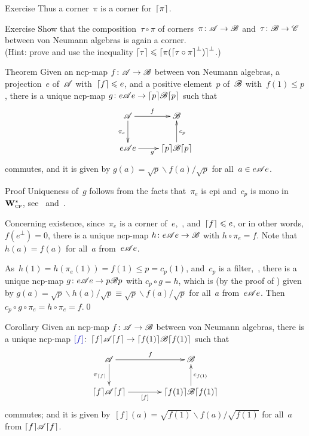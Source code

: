 \documentclass[a]{subfiles}
\begin{document}
\begin{parsec}
\begin{point}{Exercise}
Thus a corner~$\pi$ is a corner for~$\left\lceil\pi\right\rceil$.
\end{point}
\begin{point}{Exercise}%
Show that the composition~$\tau\circ \pi$
of corners~$\pi\colon \mathscr{A}\to\mathscr{B}$
and~$\tau\colon \mathscr{B}\to\mathscr{C}$
between von Neumann algebras
is again a corner.\\
(Hint:
prove
and use the inequality
$\left\lceil\tau\right\rceil\leqslant \left\lceil\smash{\pi(\left\lceil\tau\circ \pi\right\rceil^\perp)}\right\rceil^\perp$.)
\end{point}
\begin{point}{Theorem}%
Given an ncp-map $f\colon\mathscr{A}\to\mathscr{B}$
between von Neumann algebras,
a projection~$e$ of~$\mathscr{A}$
with~$\left\lceil f\right\rceil\leqslant e$,
and a positive element~$p$
of~$\mathscr{B}$ with~$f(1) \leq p$,
there is a unique ncp-map
$g \colon e\mathscr{A} e
\to \left\lceil p\right\rceil\!\mathscr{B}\!\left\lceil p\right\rceil$
such that
\begin{equation*}
\xymatrix{
\scrA
\ar[r]^-f
\ar[d]_{\pi_e}
&
\scrB
\\
e\scrA e
\ar[r]_g
& 
\ceil{p}\!\scrB\!\ceil{p}
\ar[u]_{c_p}
}
\end{equation*}
commutes,
and it is given by
$g(a)=\sqrt{p}\backslash f(a)/\!\sqrt{p}$
for all~$a\in e\mathscr{A} e$.
\begin{point}{Proof}%
Uniqueness of~$g$ follows from the facts
that~$\pi_e$ is epi and~$c_p$ is mono
in~$\mathbf{W}^*_{\text{\textsc{cp}}}$,
see~ and~.

Concerning existence, 
since~$\pi_e$ is a corner of~$e$,~,
and~$\left\lceil f\right\rceil\leqslant e$,
or in other words, $f(e^\perp)=0$,
there is a unique ncp-map $h\colon e\mathscr{A} e\to \mathscr{B}$
with $h \circ \pi_e = f$.
Note that~$h(a)=f(a)$ for all~$a$ from~$e\mathscr{A} e$.

As~$h(1)=h(\pi_e(1))=f(1)\leq p=c_p(1)$,
and~$c_p$ is a filter,~,
there is a unique ncp-map
$g\colon e\mathscr{A} e \to p \mathscr{B} p$
with $c_p\circ g = h$,
which is (by the proof of ) given by
$g(a)=\sqrt{p}\backslash h(a)/\sqrt{p}
\equiv \sqrt{p}\backslash f(a)/\sqrt{p}$
for all~$a$ from~$e\mathscr{A} e$.
Then~$c_p\circ g\circ \pi_e = h\circ \pi_e = f$.\qed
\end{point}
\end{point}
\begin{point}[square-f]{Corollary}%
Given an ncp-map $f\colon \mathscr{A}\to\mathscr{B}$
between von Neumann algebras,
there is a unique ncp-map $\Define{[f]}\colon 
\ceil{f}\!\scrA\!\ceil{f}
\to
\ceil{f(1)}\!\scrB\!\ceil{f(1)}$%
such that 
\begin{equation*}
\xymatrix@C=4em{
\scrA
\ar[r]^-f
\ar[d]_{\pi_{\ceil{f}}}
&
\scrB
\\
\ceil{f}\!\scrA\!\ceil{f}
\ar[r]_-{[f]}
& 
\ceil{f(1)}\!\scrB\!\ceil{f(1)}
\ar[u]_{c_{f(1)}}
}
\end{equation*}
commutes;
and it is given by~$[f](a)=\sqrt{f(1)}\backslash f(a)/\!\sqrt{f(1)}$
for all~$a$ from $\left\lceil f\right\rceil\!\mathscr{A}\!\left\lceil f\right\rceil$.


\end{point}
\end{parsec}
\end{document}
